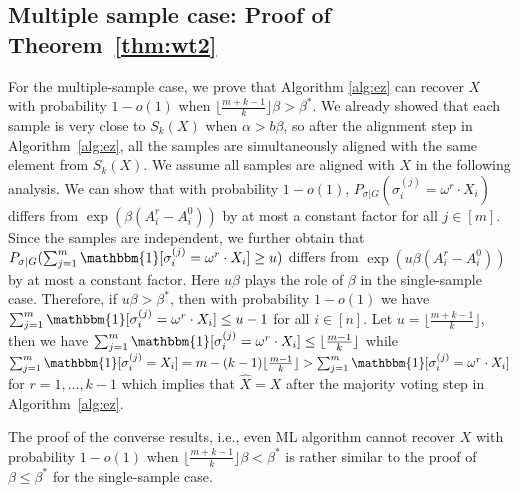 \documentclass[conference]{IEEEtran}
\begin{document}
	\subsection{Multiple sample case: Proof of Theorem~\ref{thm:wt2}}
	\label{sect:multi}
	
	
	For the multiple-sample case,
	we prove that Algorithm \ref{alg:ez} can recover $X$ with probability $1-o(1)$ when $\lfloor \frac{m+k-1}{k} \rfloor \beta>\beta^\ast$.
	We already showed that each sample is very close to $S_k(X)$ when $\alpha > b \beta$,
	so after the alignment step in Algorithm~\ref{alg:ez},
	all the samples are simultaneously aligned with the same element from $S_k(X)$.
	We assume all samples are aligned with $X$ in the following analysis.
	We can show that
	with probability $1-o(1)$, $P_{\sigma|G}(\sigma_i^{(j)}  = \omega^r \cdot X_i)$ differs from
	$ \exp (\beta (A^r_i-A^0_i))$ by at most a constant factor for all $j\in[m]$.
	Since the samples are independent,
	we further obtain that $P_{\sigma|G}(\sum_{j=1}^m\mathbbm{1}[\sigma_i^{(j)}  = \omega^r \cdot X_i]\ge u)$ differs from
	$ \exp ( u \beta (A^r_i-A^0_i))$
	by at most a constant factor.
	Here $u\beta$ plays the role of $\beta$ in the single-sample case.
	Therefore, if $u\beta>\beta^\ast$, then with probability $1-o(1)$ we have $\sum_{j=1}^m\mathbbm{1}[\sigma_i^{(j)} = \omega^r \cdot X_i] \le u-1$ for all $i\in[n]$. Let $u=\lfloor \frac{m+k-1}{k} \rfloor$,
	then we have $\sum_{j=1}^m\mathbbm{1}[\sigma_i^{(j)}  = \omega^r \cdot X_i] \le \lfloor \frac{m-1}{k} \rfloor $
	while $\sum_{j=1}^m\mathbbm{1}[\sigma_i^{(j)} = X_i]
	= m - (k-1)\lfloor \frac{m-1}{k} \rfloor > \sum_{j=1}^m\mathbbm{1}[\sigma_i^{(j)}  = \omega^r \cdot X_i] $ for $r=1, \dots, k-1$
	which implies that $\hat{X}=X$ after the majority voting step in Algorithm~\ref{alg:ez}.
	
	The proof of the converse results, i.e., even ML algorithm cannot recover $X$ with probability $1-o(1)$ when
	$\lfloor \frac{m+k-1}{k} \rfloor  \beta < \beta^\ast$ is rather similar to the proof of $\beta\le\beta^\ast$ for the single-sample case.
	
	
	
\end{document}
